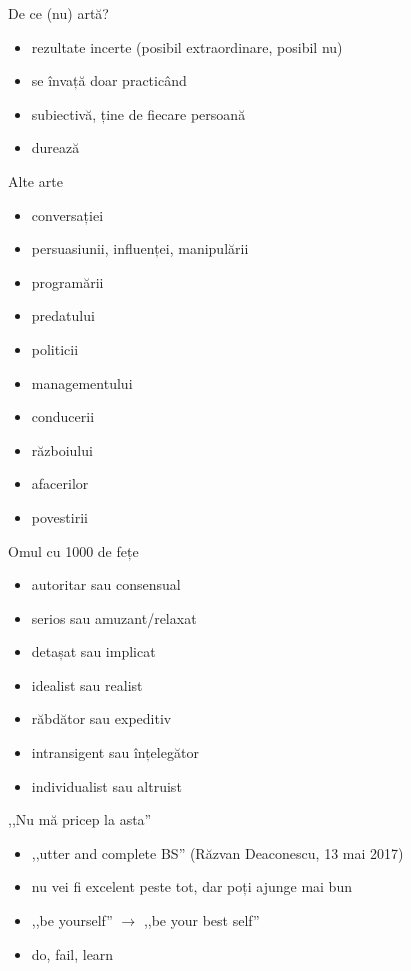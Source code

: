 \documentclass{simple}
\begin{document}
\begin{frame}{De ce (nu) artă?}
  \begin{itemize}
    \pause
    \item rezultate incerte (posibil extraordinare, posibil nu)
    \item se învață doar practicând
    \item subiectivă, ține de fiecare persoană
    \item durează
  \end{itemize}
\end{frame}

\begin{frame}{Alte arte}
  \begin{itemize}
    \pause
    \item conversației
    \item persuasiunii, influenței, manipulării
    \item programării
    \item predatului
    \item politicii
    \item managementului
    \item conducerii
    \item războiului
    \item afacerilor
    \item povestirii
  \end{itemize}
\end{frame}

\begin{frame}{Omul cu 1000 de fețe}
  \begin{itemize}
    \pause
    \item autoritar sau consensual
    \pause
    \item serios sau amuzant/relaxat
    \pause
    \item detașat sau implicat
    \pause
    \item idealist sau realist
    \pause
    \item răbdător sau expeditiv
    \pause
    \item intransigent sau înțelegător
    \pause
    \item individualist sau altruist
  \end{itemize}
\end{frame}

\begin{frame}{,,Nu mă pricep la asta''}
  \begin{itemize}
    \pause
    \item ,,utter and complete BS'' (Răzvan Deaconescu, 13 mai 2017)
    \pause
    \item nu vei fi excelent peste tot, dar poți ajunge mai bun
    \pause
    \item ,,be yourself'' $\rightarrow$ ,,be your best self''
    \pause
    \item do, fail, learn
  \end{itemize}
\end{frame}
\end{document}
